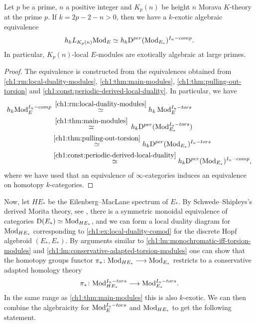 \begin{corollary}
    \label{ch1:cor:main-modules-dual}
    Let $p$ be a prime, $n$ a positive integer and $K_p(n)$ be height $n$ Morava $K$-theory at the prime $p$. If $k=2p-2-n>0$, then we have a $k$-exotic algebraic equivalence 
    $$h_k L_{K_p(n)}\mathrm{Mod}_{E} \simeq h_k \mathrm{D}^{per}(\mathrm{Mod}_{E_*})^{I_n-comp}.$$ 
    In particular, $K_p(n)$-local $E$-modules are exotically algebraic at large primes. 
\end{corollary}
\begin{proof}
    The equivalence is constructed from the equivalences obtained from \cref{ch1:rm:local-duality-modules}, \cref{ch1:thm:main-modules}, \cref{ch1:thm:pulling-out-torsion} and \cref{ch1:const:periodic-derived-local-duality}. In particular, we have
    \begin{align*}
        h_k \mathrm{Mod}_{E}^{I_n-comp}
        &\hspace{2pt}\overset{\ref{ch1:rm:local-duality-modules}}\simeq 
        h_k \hspace{2pt} \mathrm{Mod}_{E}^{I_n-tors} \\
        &\hspace{2pt}\overset{\ref{ch1:thm:main-modules}}\simeq 
        \hspace{2pt} h_k \mathrm{D}^{per}(\mathrm{Mod}_{E_*}^{I_n-tors}) \\
        &\overset{\ref{ch1:thm:pulling-out-torsion}}\simeq
        h_k \mathrm{D}^{per}(\mathrm{Mod}_{E_*})^{I_n-tors} \\
        &\overset{\ref{ch1:const:periodic-derived-local-duality}}\simeq 
        h_k \mathrm{D}^{per}(\mathrm{Mod}_{E_*})^{I_n-comp},
    \end{align*}
    where we have used that an equivalence of $\infty$-categories induces an equivalence on homotopy $k$-categories.
\end{proof}

Now, let $HE_*$ be the Eilenberg--MacLane spectrum of $E_*$. By Schwede--Shipleys's derived Morita theory, see \cite[7.1.1.16]{Lurie_HA}, there is a symmetric monoidal equivalence of categories $\mathrm{D}(E_*)\simeq \mathrm{Mod}_{HE_*}$, and we can form a local duality diagram for $\mathrm{Mod}_{HE_*}$ corresponding to \cref{ch1:ex:local-duality-comod} for the discrete Hopf algebroid $(E_*, E_*)$. By arguments similar to \cref{ch1:lm:monochromatic-iff-torsion-modules} and \cref{ch1:lm:conservative-adapted-torsion-modules} one can show that the homotopy groups functor $\pi_*\colon \mathrm{Mod}_{HE_*}\longrightarrow \mathrm{Mod}_{E_*}$ restricts to a conservative adapted homology theory 
$$\pi_* \colon \mathrm{Mod}_{HE_*}^{I_n-tors}\longrightarrow \mathrm{Mod}_{E_*}^{I_n-tors}.$$
In the same range as \cref{ch1:thm:main-modules} this is also $k$-exotic. We can then combine the algebraicity for $\mathrm{Mod}_{E}^{I_n-tors}$ and $\mathrm{Mod}_{HE_*}$ to get the following statement. 

